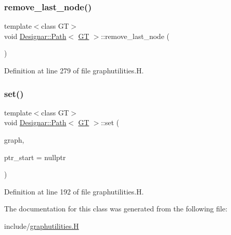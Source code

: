 \subsubsection{\texorpdfstring{remove\+\_\+last\+\_\+node()}{remove\_last\_node()}}
{\footnotesize\ttfamily template$<$class GT$>$ \\
void \hyperlink{class_designar_1_1_path}{Designar\+::\+Path}$<$ \hyperlink{demo-buildgraph_8_c_a3001c40d2c31ca87ed96cd7d1334a55e}{GT} $>$\+::remove\+\_\+last\+\_\+node (\begin{DoxyParamCaption}{ }\end{DoxyParamCaption})\hspace{0.3cm}{\ttfamily [inline]}}



Definition at line 279 of file graphutilities.\+H.

\mbox{\label{class_designar_1_1_path_a72190e285c2c85aae75b0c8435f1eee9}} 
\subsubsection{\texorpdfstring{set()}{set()}}
{\footnotesize\ttfamily template$<$class GT$>$ \\
void \hyperlink{class_designar_1_1_path}{Designar\+::\+Path}$<$ \hyperlink{demo-buildgraph_8_c_a3001c40d2c31ca87ed96cd7d1334a55e}{GT} $>$\+::set (\begin{DoxyParamCaption}\item[{\hyperlink{demo-buildgraph_8_c_a3001c40d2c31ca87ed96cd7d1334a55e}{GT} \&}]{graph,  }\item[{\hyperlink{class_designar_1_1_path_a7b499fd50e96e3360968d4cfef7a3736}{Node\+Type} $\ast$}]{ptr\+\_\+start = {\ttfamily nullptr} }\end{DoxyParamCaption})\hspace{0.3cm}{\ttfamily [inline]}}



Definition at line 192 of file graphutilities.\+H.



The documentation for this class was generated from the following file\+:\begin{DoxyCompactItemize}
\item 
include/\hyperlink{graphutilities_8_h}{graphutilities.\+H}\end{DoxyCompactItemize}
